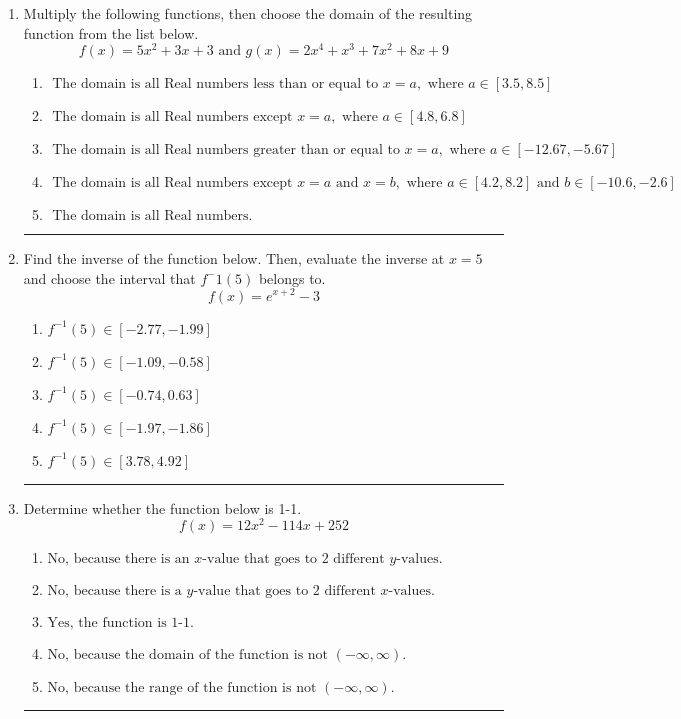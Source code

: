 \documentclass[14pt]{extbook}
\newcommand{\litem}[1]{\item#1\hspace*{-1cm}\rule{\textwidth}{0.4pt}}
\begin{document}
\begin{enumerate}
{\begin{enumerate}[label=\Alph*.]
\end{enumerate} }
\litem{
Multiply the following functions, then choose the domain of the resulting function from the list below.\[ f(x) = 5x^{2} +3 x + 3 \text{ and } g(x) = 2x^{4} + x^{3} +7 x^{2} +8 x + 9 \]\begin{enumerate}[label=\Alph*.]
\item \( \text{ The domain is all Real numbers less than or equal to } x = a, \text{ where } a \in [3.5, 8.5] \)
\item \( \text{ The domain is all Real numbers except } x = a, \text{ where } a \in [4.8, 6.8] \)
\item \( \text{ The domain is all Real numbers greater than or equal to } x = a, \text{ where } a \in [-12.67, -5.67] \)
\item \( \text{ The domain is all Real numbers except } x = a \text{ and } x = b, \text{ where } a \in [4.2, 8.2] \text{ and } b \in [-10.6, -2.6] \)
\item \( \text{ The domain is all Real numbers. } \)

\end{enumerate} }
\litem{
Find the inverse of the function below. Then, evaluate the inverse at $x = 5$ and choose the interval that $f^-1(5)$ belongs to.\[ f(x) = e^{x+2}-3 \]\begin{enumerate}[label=\Alph*.]
\item \( f^{-1}(5) \in [-2.77, -1.99] \)
\item \( f^{-1}(5) \in [-1.09, -0.58] \)
\item \( f^{-1}(5) \in [-0.74, 0.63] \)
\item \( f^{-1}(5) \in [-1.97, -1.86] \)
\item \( f^{-1}(5) \in [3.78, 4.92] \)

\end{enumerate} }
\litem{
Determine whether the function below is 1-1.\[ f(x) = 12 x^2 - 114 x + 252 \]\begin{enumerate}[label=\Alph*.]
\item \( \text{No, because there is an $x$-value that goes to 2 different $y$-values.} \)
\item \( \text{No, because there is a $y$-value that goes to 2 different $x$-values.} \)
\item \( \text{Yes, the function is 1-1.} \)
\item \( \text{No, because the domain of the function is not $(-\infty, \infty)$.} \)
\item \( \text{No, because the range of the function is not $(-\infty, \infty)$.} \)


\end{enumerate}}
\end{enumerate}
\end{document}
